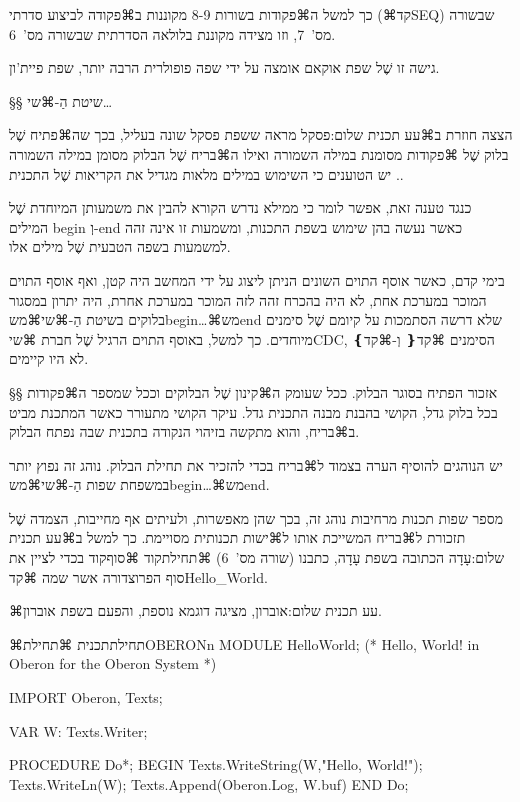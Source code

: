     כך למשל ה⌘פקודות בשורות 8-9 מקוננות ב⌘פקודה לביצוע סדרתי (⌘קד{SEQ}) שבשורה
    מס'~7, וזו מצידה מקוננת בלולאה הסדרתית שבשורה מס'~6.

    גישה זו שֶׁל שפת אוקאם אומצה על ידי שפה פופולרית הרבה יותר, שפת פיית'ון.

    §§ שיטת הַ-⌘שי{…}

    הצצה חוזרת ב⌘עע תכנית שלום:פסקל מראה ששפת פסקל שונה בעליל, בכך שה⌘פתיח שֶׁל בלוק
    שֶׁל ⌘פקודות מסומנת במילה השמורה  ואילו ה⌘בריח שֶׁל הבלוק מסומן במילה
    השמורה .
    יש הטוענים כי השימוש במילים מלאות מגדיל את הקריאות שֶׁל התכנית.

    כנגד טענה זאת, אפשר לומר כי ממילא נדרש הקורא להבין את משמעותן המיוחדת שֶׁל
    המילים begin וְ-end כאשר נעשה בהן שימוש בשפת התכנות, ומשמעות זו אינה זהה
    למשמעות בשפה הטבעית שֶׁל מילים אלו.

    בימי קדם, כאשר אוסף התוים השונים הניתן ליצוג על ידי המחשב היה קטן, ואף אוסף
    התוים המוכר במערכת אחת, לא היה בהכרח זהה לזה המוכר במערכת אחרת, היה יתרון
    במסגור בלוקים בשיטת הַ-⌘שי{⌘מש{begin}…⌘מש{end}} שלא דרשה הסתמכות על
    קיומם שֶׁל סימנים מיוחדים. כך למשל, באוסף התוים הרגיל שֶׁל חברת ⌘שי{CDC},
    הסימנים ⌘קד{❴} וְ-⌘קד{❵} לא היו קיימים.

    §§ אזכור הפתיח בסוגר הבלוק.
    ככל שעומק ה⌘קינון שֶׁל הבלוקים וככל שמספר ה⌘פקודות בכל בלוק גדל, הקושי בהבנת מבנה
    התכנית גדל. עיקר הקושי מתעורר כאשר המתכנת מביט ב⌘בריח, והוא מתקשה בזיהוי
    הנקודה בתכנית שבה נפתח הבלוק.

    יש הנוהגים להוסיף הערה בצמוד ל⌘בריח בכדי להזכיר את תחילת הבלוק. נוהג
    זה נפוץ יותר במשפחת שפות הַ-⌘שי{⌘מש{begin}…⌘מש{end}}.

    מספר שפות תכנות מרחיבות נוהג זה, בכך שהן מאפשרות, ולעיתים אף מחייבות, הצמדה
    שֶׁל תזכורת ל⌘בריח המשייכת אותו ל⌘ישות תכנותית מסויימת.
    כך למשל ב⌘עע תכנית שלום:עָדָה הכתובה בשפת עָדָה, כתבנו
    (שורה מס'~6)
    ⌘תחילת{קוד}
    ⌘סוף{קוד}
    בכדי לציין את סוף הפרוצדורה אשר שמה ⌘קד{Hello\_World}.

    ⌘עע תכנית שלום:אוברון, מציגה דוגמא נוספת, והפעם בשפת אוברון.

    ⌘תחילת{תכנית}
    ⌘תחילת{OBERONn}
      MODULE HelloWorld;
      (* Hello, World! in Oberon for the Oberon System *)

      IMPORT Oberon, Texts;

      VAR
      W: Texts.Writer;

      PROCEDURE Do*;
      BEGIN
      Texts.WriteString(W,"Hello, World!");
      Texts.WriteLn(W);
      Texts.Append(Oberon.Log, W.buf)
      END Do;

